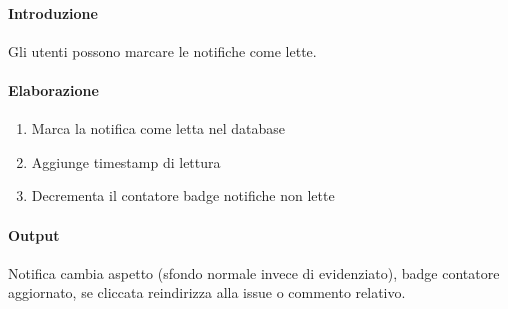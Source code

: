 \begin{reqbox}[title=REQ-FUN-20: Prendi Visione Notifica]
\label{subsubsec:req-prendi-visione-notifica}

\paragraph{Introduzione}
Gli utenti possono marcare le notifiche come lette.

\paragraph{Elaborazione}
\begin{enumerate}[leftmargin=1.1em]
\item Marca la notifica come letta nel database
\item Aggiunge timestamp di lettura
\item Decrementa il contatore badge notifiche non lette
\end{enumerate}

\paragraph{Output}
Notifica cambia aspetto (sfondo normale invece di evidenziato), badge contatore aggiornato, se cliccata reindirizza alla issue o commento relativo.

\end{reqbox}

\vspace{0.5cm}

\newpage



